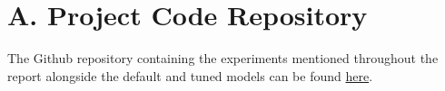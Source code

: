 \documentclass[10pt,twocolumn,letterpaper]{article}
\begin{document}







\newpage

{\small


}


\newpage

\section{A. Project Code Repository}
The Github repository containing the experiments mentioned throughout the report alongside the default and tuned models can be found \hyperlink{https://github.com/jadenzwicker/DL-Final-Project/tree/main}{here}. 






\newpage
\end{document}
